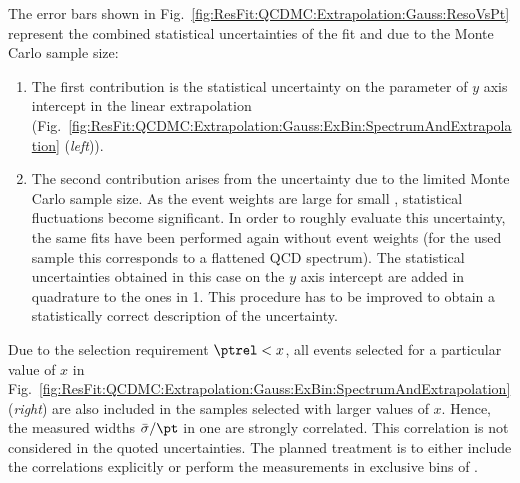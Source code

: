 The error bars shown in Fig.~\ref{fig:ResFit:QCDMC:Extrapolation:Gauss:ResoVsPt} represent the combined statistical uncertainties of the fit and due to the Monte Carlo sample size:
\begin{enumerate}
\item The first contribution is the statistical uncertainty on the parameter of $y$ axis intercept in the linear extrapolation (Fig.~\ref{fig:ResFit:QCDMC:Extrapolation:Gauss:ExBin:SpectrumAndExtrapolation} (\textit{left})).
\item The second contribution arises from the uncertainty due to the limited Monte Carlo sample size.
 As the event weights are large for small \pt, statistical fluctuations become significant.
 In order to roughly evaluate this uncertainty, the same fits have been performed again without event weights (for the used sample this corresponds to a flattened QCD spectrum).
 The statistical uncertainties obtained in this case on the $y$ axis intercept are added in quadrature to the ones in 1.
 This procedure has to be improved to obtain a statistically correct description of the uncertainty.
\end{enumerate}

Due to the selection requirement \mbox{$\ptrel < x$}, all events selected for a particular value of $x$ in Fig.~\ref{fig:ResFit:QCDMC:Extrapolation:Gauss:ExBin:SpectrumAndExtrapolation} (\textit{right}) are also included in the samples selected with larger values of $x$.
Hence, the measured widths $\bar{\sigma}/\pt$ in one \pt are strongly correlated.
This correlation is not considered in the quoted uncertainties.
The planned treatment is to either include the correlations explicitly or perform the measurements in exclusive bins of \ptrel.

